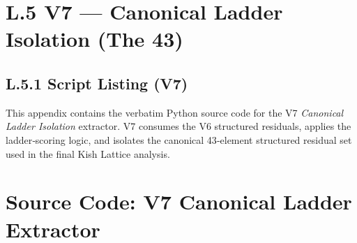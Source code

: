 \documentclass[11pt, letterpaper, openany]{book}
\begin{document}
\section*{L.5 V7 — Canonical Ladder Isolation (The 43)}

\subsection*{L.5.1 Script Listing (V7)}
This appendix contains the verbatim Python source code for the V7
\textit{Canonical Ladder Isolation} extractor.  
V7 consumes the V6 structured residuals, applies the ladder‑scoring logic,
and isolates the canonical 43‑element structured residual set used in the
final Kish Lattice analysis.

\section*{Source Code: V7 Canonical Ladder Extractor}
\end{document}
